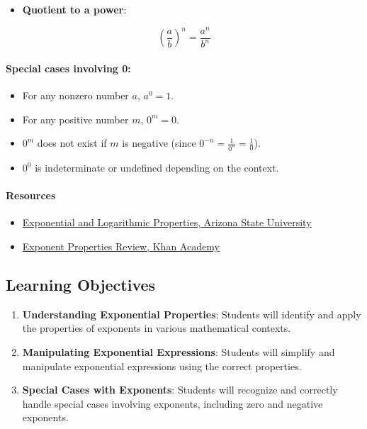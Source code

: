 \begin{itemize}
    \item \textbf{Quotient to a power}:
\end{itemize}
  $$
  \left(\frac{a}{b}\right)^n = \frac{a^n}{b^n}
  $$

\paragraph{Special cases involving 0:}

\begin{itemize}
    \item For any nonzero number $a$, $a^0 = 1$.
    \item For any positive number $m$, $0^m = 0$.
    \item $0^m$ does not exist if $m$ is negative (since $0^{-n} = \frac{1}{0^n} = \frac{1}{0}$).
    \item $0^0$ is indeterminate or undefined depending on the context.
\end{itemize}

\paragraph{Resources}

\begin{itemize}
    \item \href{https://tutoring.asu.edu/sites/default/files/exponentialandlogrithmicproperties.pdf}{Exponential and Logarithmic Properties, Arizona State University}
    \item \href{https://www.khanacademy.org/math/cc-eighth-grade-math/cc-8th-numbers-operations/cc-8th-exponent-properties/a/exponent-properties-review}{Exponent Properties Review, Khan Academy}
\end{itemize}

\subsection{Learning Objectives}

\begin{enumerate}
    \item \textbf{Understanding Exponential Properties}: Students will identify and apply the properties of exponents in various mathematical contexts.
    \item \textbf{Manipulating Exponential Expressions}: Students will simplify and manipulate exponential expressions using the correct properties.
    \item \textbf{Special Cases with Exponents}: Students will recognize and correctly handle special cases involving exponents, including zero and negative exponents.
\end{enumerate}

